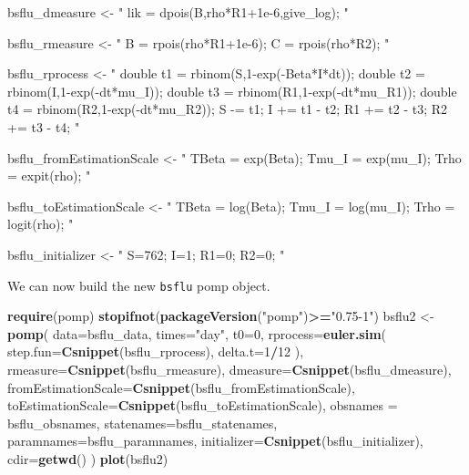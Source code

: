 \documentclass[]{article}
\newenvironment{Shaded}{\begin{snugshade}}{\end{snugshade}}
\newcommand{\KeywordTok}[1]{\textcolor[rgb]{0.13,0.29,0.53}{\textbf{#1}}}
\newcommand{\DataTypeTok}[1]{\textcolor[rgb]{0.13,0.29,0.53}{#1}}
\newcommand{\DecValTok}[1]{\textcolor[rgb]{0.00,0.00,0.81}{#1}}
\newcommand{\StringTok}[1]{\textcolor[rgb]{0.31,0.60,0.02}{#1}}
\newcommand{\OperatorTok}[1]{\textcolor[rgb]{0.81,0.36,0.00}{\textbf{#1}}}
\newcommand{\NormalTok}[1]{#1}
\begin{document}
\begin{Shaded}
\begin{Highlighting}[]
\NormalTok{bsflu_dmeasure <-}\StringTok{ "}
\StringTok{  lik = dpois(B,rho*R1+1e-6,give_log);}
\StringTok{"}

\NormalTok{bsflu_rmeasure <-}\StringTok{ "}
\StringTok{  B = rpois(rho*R1+1e-6);}
\StringTok{  C = rpois(rho*R2);}
\StringTok{"}

\NormalTok{bsflu_rprocess <-}\StringTok{ "}
\StringTok{  double t1 = rbinom(S,1-exp(-Beta*I*dt));}
\StringTok{  double t2 = rbinom(I,1-exp(-dt*mu_I));}
\StringTok{  double t3 = rbinom(R1,1-exp(-dt*mu_R1));}
\StringTok{  double t4 = rbinom(R2,1-exp(-dt*mu_R2));}
\StringTok{  S -= t1;}
\StringTok{  I += t1 - t2;}
\StringTok{  R1 += t2 - t3;}
\StringTok{  R2 += t3 - t4;}
\StringTok{"}

\NormalTok{bsflu_fromEstimationScale <-}\StringTok{ "}
\StringTok{ TBeta = exp(Beta);}
\StringTok{ Tmu_I = exp(mu_I);}
\StringTok{ Trho = expit(rho);}
\StringTok{"}

\NormalTok{bsflu_toEstimationScale <-}\StringTok{ "}
\StringTok{ TBeta = log(Beta);}
\StringTok{ Tmu_I = log(mu_I);}
\StringTok{ Trho = logit(rho);}
\StringTok{"}

\NormalTok{bsflu_initializer <-}\StringTok{ "}
\StringTok{ S=762;}
\StringTok{ I=1;}
\StringTok{ R1=0;}
\StringTok{ R2=0;}
\StringTok{"}
\end{Highlighting}
\end{Shaded}


We can now build the new \texttt{bsflu} pomp object.

\begin{Shaded}
\begin{Highlighting}[]
\KeywordTok{require}\NormalTok{(pomp)}
\KeywordTok{stopifnot}\NormalTok{(}\KeywordTok{packageVersion}\NormalTok{(}\StringTok{"pomp"}\NormalTok{)}\OperatorTok{>=}\StringTok{"0.75-1"}\NormalTok{)}
\NormalTok{bsflu2 <-}\StringTok{ }\KeywordTok{pomp}\NormalTok{(}
  \DataTypeTok{data=}\NormalTok{bsflu_data,}
  \DataTypeTok{times=}\StringTok{"day"}\NormalTok{,}
  \DataTypeTok{t0=}\DecValTok{0}\NormalTok{,}
  \DataTypeTok{rprocess=}\KeywordTok{euler.sim}\NormalTok{(}
    \DataTypeTok{step.fun=}\KeywordTok{Csnippet}\NormalTok{(bsflu_rprocess),}
    \DataTypeTok{delta.t=}\DecValTok{1}\OperatorTok{/}\DecValTok{12}
\NormalTok{  ),}
  \DataTypeTok{rmeasure=}\KeywordTok{Csnippet}\NormalTok{(bsflu_rmeasure),}
  \DataTypeTok{dmeasure=}\KeywordTok{Csnippet}\NormalTok{(bsflu_dmeasure),}
  \DataTypeTok{fromEstimationScale=}\KeywordTok{Csnippet}\NormalTok{(bsflu_fromEstimationScale),}
  \DataTypeTok{toEstimationScale=}\KeywordTok{Csnippet}\NormalTok{(bsflu_toEstimationScale),}
  \DataTypeTok{obsnames =}\NormalTok{ bsflu_obsnames,}
  \DataTypeTok{statenames=}\NormalTok{bsflu_statenames,}
  \DataTypeTok{paramnames=}\NormalTok{bsflu_paramnames,}
  \DataTypeTok{initializer=}\KeywordTok{Csnippet}\NormalTok{(bsflu_initializer),}
  \DataTypeTok{cdir=}\KeywordTok{getwd}\NormalTok{()}
\NormalTok{)}
\KeywordTok{plot}\NormalTok{(bsflu2)}
\end{Highlighting}
\end{Shaded}
\end{document}
